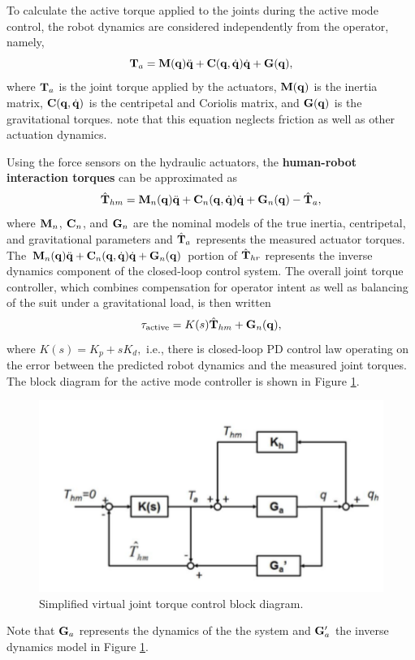 \begin{refsection}
To calculate the active torque applied to the joints during the active mode control, the robot dynamics are considered independently from the operator, namely,
\begin{equation}
{\bf T}_a = {\bf M}({\bf q})\ddot{{\bf q}} + {\bf C}({\bf q},\dot{{\bf q}})\dot{{\bf q}}+{\bf G}({\bf q}),
\label{dynamics}
\end{equation}   
where ${\bf T}_a$ is the joint torque applied by the actuators, ${\bf M}({\bf q})$ is the inertia matrix, ${\bf C}({\bf q},\dot{{\bf q}})$ is the centripetal and Coriolis matrix, and ${\bf G}({\bf q})$ is the gravitational torques. note that this equation neglects friction as well as other actuation dynamics.

Using the force sensors on the hydraulic actuators, the {\bf human-robot interaction torques} can be approximated as
\begin{equation}
\hat{{\bf T}}_{hm} = {\bf M}_n({\bf q})\ddot{{\bf q}} + {\bf C}_n({\bf q},\dot{{\bf q}})\dot{{\bf q}} + {\bf G}_n({\bf q}) - \hat{{\bf T}}_a, \notag
\end{equation}
where ${\bf M}_n$, ${\bf C}_n$, and ${\bf G}_n$ are the nominal models of the true inertia, centripetal, and gravitational parameters and $\hat{{\bf T}}_a$ represents the measured actuator torques.  The ${\bf M}_n({\bf q})\ddot{{\bf q}} + {\bf C}_n({\bf q},\dot{{\bf q}})\dot{{\bf q}} + {\bf G}_n({\bf q}) $ portion of $\hat{{\bf T}}_{hr}$ represents the inverse dynamics component of the closed-loop control system.  The overall joint torque controller, which combines compensation for operator intent as well as balancing of the suit under a gravitational load, is then written \[ {\bf\tau}_\text{active} = K(s) \hat{{\bf T}}_{hm} + {\bf G}_n({\bf q}),\] where $K(s) = K_p +s K_d,$ i.e., there is closed-loop PD control law operating on the error between the predicted robot dynamics and the measured joint torques.  The block diagram for the active mode controller is shown in Figure \ref{fig:blockDia}. 
 \begin{figure}[thpb]
\centering
\includegraphics[width=3.in]{exos/figs/hydLowerExrem/blockDia}
  \caption{Simplified virtual joint torque control block diagram.}
 \label{fig:blockDia}   
 \end{figure}
 Note that ${\bf G}_a$ represents the dynamics of the the system and ${\bf G}_a'$ the inverse dynamics model in Figure \ref{fig:blockDia}.


\end{refsection}
